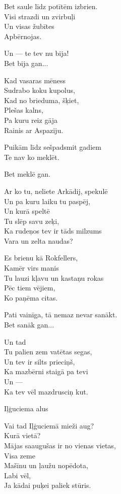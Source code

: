 \documentclass[14pt]{extarticle}
\begin{document}
Bet saule līdz potītēm izbrien.\\
Visi strazdi un zvirbuļi\\
Un visas žubītes\\
Apbērnojas.

Un --- te tev nu bija!\\
Bet bija gan...

Kad vasaras mēness\\
Sudrabo koku kupolus,\\
Kad no brieduma, šķiet,\\
Plešas kalns,\\
Pa kuru reiz gāja\\
Rainis ar Aspaziju.

Puikām līdz sešpadsmit gadiem\\
Te nav ko meklēt.

Bet meklē gan.

Ar ko tu, neliete Arkādij, spekulē\\
Un pa kuru laiku tu paspēj,\\
Un kurā speltē\\
Tu slēp savu zeķi,\\
Ka rudeņos tev ir tāds milzums\\
Vara un zelta naudas?

Es brienu kā Rokfellers,\\
Kamēr virs manis\\
Tu lauzi kļavu un kastaņu rokas\\
Pēc tiem vējiem,\\
Ko paņēma citas.

Pati vainīga, tā nemaz nevar sanākt.\\
Bet sanāk gan...

Un tad\\
Tu palien zem vatētas segas,\\
Un tev ir silts prieciņš,\\
Ka mazbērni staigā pa tevi\\
Un ---\\
Ka tev vēl mazdrusciņ kut.


\newpage

{\large \sc Iļģuciema alus}

Vai tad Iļģuciemā mieži aug?\\
Kurā vietā?\\
Mājas saaugušas ir no vienas vietas,\\
Visa zeme\\
Mašīnu un ļaužu nopēdota,\\
Labi vēl,\\
Ja kādai puķei paliek stūris.
\end{document}
